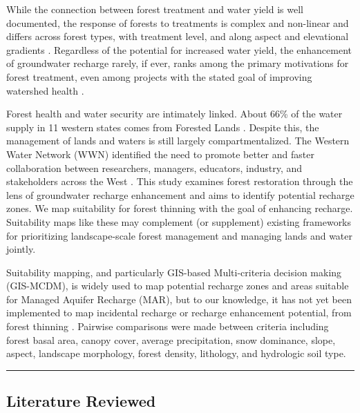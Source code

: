 \documentclass[
  number]{elsarticle}
\begin{document}
While the connection between forest treatment and water yield is well
documented, the response of forests to treatments is complex and
non-linear and differs across forest types, with treatment level, and
along aspect and elevational gradients
\citep{del_campo_global_2022, biederman_streamflow_2022, zou_streamflow_2010, hibbert1979, moore_physical_2005}.
Regardless of the potential for increased water yield, the enhancement
of groundwater recharge rarely, if ever, ranks among the primary
motivations for forest treatment, even among projects with the stated
goal of improving watershed health
\citep{stanturf2014, filoso2017, allen_ecological_2002, friederici2013, odonnell2016}.

Forest health and water security are intimately linked. About 66\% of
the water supply in 11 western states comes from Forested Lands
\citep{brown_source_2005}. Despite this, the management of lands and
waters is still largely compartmentalized. The Western Water Network
(WWN) identified the need to promote better and faster collaboration
between researchers, managers, educators, industry, and stakeholders
across the West \citep{hansen2024}. This study examines forest
restoration through the lens of groundwater recharge enhancement and
aims to identify potential recharge zones. We map suitability for forest
thinning with the goal of enhancing recharge. Suitability maps like
these may complement (or supplement) existing frameworks for
prioritizing landscape-scale forest management and managing lands and
water jointly.

Suitability mapping, and particularly GIS-based Multi-criteria decision
making (GIS-MCDM), is widely used to map potential recharge zones and
areas suitable for Managed Aquifer Recharge (MAR), but to our knowledge,
it has not yet been implemented to map incidental recharge or recharge
enhancement potential, from forest thinning
\citep{fathi2021, rajashekar2023, rahman2012}. Pairwise comparisons were
made between criteria including forest basal area, canopy cover, average
precipitation, snow dominance, slope, aspect, landscape morphology,
forest density, lithology, and hydrologic soil type.

\begin{center}\rule{0.5\linewidth}{0.5pt}\end{center}

\subsection{Literature Reviewed}\label{literature-reviewed}
\end{document}
